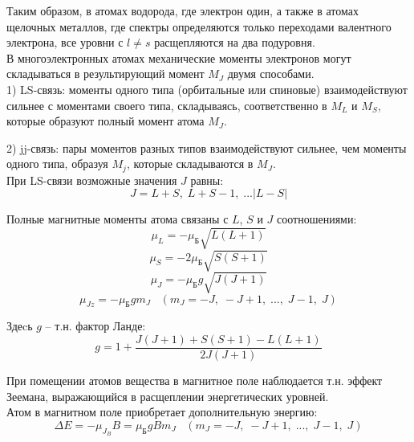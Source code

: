 \documentclass{article}
\begin{document}
	Таким образом, в атомах водорода, где электрон один, а также в атомах щелочных металлов, где спектры определяются только переходами валентного электрона, все уровни с $l\neq s$ расщепляются на два подуровня.\\

	В многоэлектронных атомах механические моменты электронов могут складываться в результирующий момент $M_J$ двумя способами.\\

	1) LS-связь: моменты одного типа (орбитальные или спиновые) взаимодействуют сильнее с моментами своего типа, складываясь, соответственно в $M_L$ и $M_S$, которые образуют полный момент атома $M_J$. 

	2) jj-связь: пары моментов разных типов взаимодействуют сильнее, чем моменты одного типа, образуя $M_j$, которые складываются в $M_J$.\\

	При LS-связи возможные значения $J$ равны:
	\begin{equation}
		J=L+S,\;L+S-1,\;...|L-S|
	\end{equation}

	Полные магнитные моменты атома связаны с $L$, $S$ и $J$ соотношениями:
	\begin{equation}
		\mu_L = -\mu_\text{Б}\sqrt{L(L+1)}
	\end{equation} 
	\begin{equation}
		\mu_S = -2\mu_\text{Б}\sqrt{S(S+1)}
	\end{equation} 
	\begin{equation}
		\mu_J = -\mu_\text{Б}g\sqrt{J(J+1)}
	\end{equation} 
	\begin{equation}
		\mu_{Jz} = -\mu_\text{Б}gm_J\;\;\;(m_J=-J,\;-J+1,\;...,\;J-1,\;J)
	\end{equation}

	Здеcь $g$ -- т.н. фактор Ланде:
	\begin{equation}
		g=1+\frac{J(J+1)+S(S+1)-L(L+1)}{2J(J+1)}
	\end{equation}

	При помещении атомов вещества в магнитное поле наблюдается т.н. эффект Зеемана, выражающийся в расщеплении энергетических уровней.\\

	Атом в магнитном поле приобретает дополнительную энергию:
	\begin{equation}
		\Delta E = -\mu_{J_B} B = \mu_\text{Б}gBm_J\;\;\;(m_J=-J,\;-J+1,\;...,\;J-1,\;J)
	\end{equation}
\end{document}
